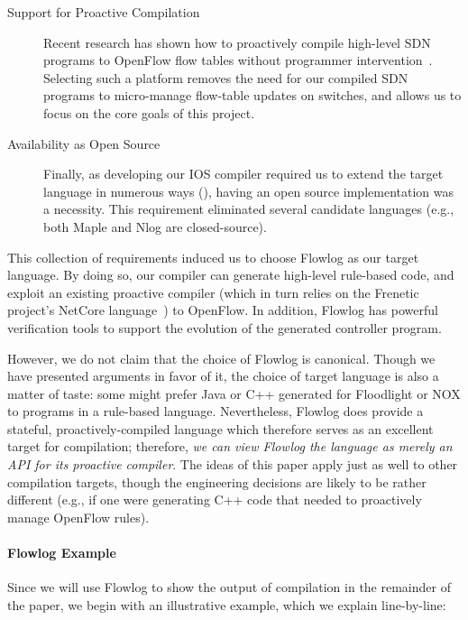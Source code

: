 \begin{description}
\item[Support for Proactive Compilation] Recent
  research has shown how to proactively
  compile high-level SDN programs to OpenFlow flow tables without
  programmer intervention~\cite{monsanto:popl12-netcore}. Selecting such a platform removes the need
  for our compiled SDN programs to micro-manage flow-table updates on
  switches, and allows us to focus on the core goals of this
  project. %

\item[Availability as Open Source] Finally, as developing our IOS
  compiler required us to extend the target language in numerous ways
  (), having an open source implementation was
  a necessity. This requirement eliminated several candidate languages
  (e.g., both Maple and Nlog are closed-source).

\end{description}
This collection of requirements induced us to choose Flowlog as
our target language. By doing so, our compiler can generate high-level
rule-based code, and exploit an existing proactive compiler (which in
turn relies on the Frenetic project's
NetCore language~\cite{monsanto:popl12-netcore}) to OpenFlow. In
addition, Flowlog has powerful verification tools to support the
evolution of the generated controller program.

However, we do not claim that the choice of Flowlog is
canonical. Though we have presented arguments in favor of it,
the choice of target language is also a matter of taste:
some might prefer Java or C++ generated for Floodlight or
NOX to programs in a rule-based
language. Nevertheless, Flowlog does provide a stateful,
proactively-compiled language which therefore serves as an excellent
target for compilation; therefore, \emph{we can view Flowlog the
  language as merely an API for its proactive compiler}. The ideas of
this paper apply just as well to other compilation targets, though the
engineering decisions are likely to be rather different (e.g., if one
were generating C++ code that needed to proactively manage OpenFlow
rules).

\paragraph{Flowlog Example}

Since we will use Flowlog to show the output of compilation in the remainder of the
paper, we begin with an illustrative example, which we explain line-by-line:

